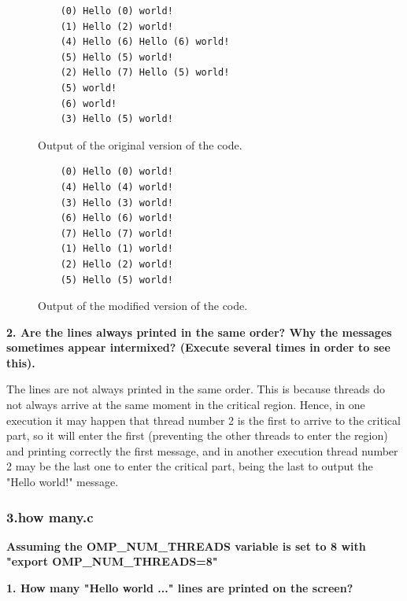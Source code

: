 \documentclass[12pt, a4paper]{article}
\begin{document}
\begin{figure}[H]
\begin{minipage}[b]{0.49\linewidth}

\begin{lstlisting}
	(0) Hello (0) world!
	(1) Hello (2) world!
	(4) Hello (6) Hello (6) world!
	(5) Hello (5) world!
	(2) Hello (7) Hello (5) world!
	(5) world!
	(6) world!
	(3) Hello (5) world!
\end{lstlisting}

\caption{Output of the original version of the code.}
\label{fig:bad_code}
\end{minipage}
\hspace{0.5cm}
\begin{minipage}[b]{0.46\linewidth}

\begin{lstlisting}
	(0) Hello (0) world!
	(4) Hello (4) world!
	(3) Hello (3) world!
	(6) Hello (6) world!
	(7) Hello (7) world!
	(1) Hello (1) world!
	(2) Hello (2) world!
	(5) Hello (5) world!
\end{lstlisting}

\caption{Output of the modified version of the code.}
\label{fig:good_code}
\end{minipage}
\end{figure}

\hfill

\textbf{2. Are the lines always printed in the same order? Why the messages sometimes appear intermixed? (Execute several times in order to see this).}

The lines are not always printed in the same order. This is because threads do not always arrive at the same moment in the critical region. Hence, in one execution it may happen that thread number 2 is the first to arrive to the critical part, so it will enter the first (preventing the other threads to enter the region) and printing correctly the first message, and in another execution thread number 2 may be the last one to enter the critical part, being the last to output the "Hello world!" message.

\subsubsection{3.how many.c}

\textbf{Assuming the OMP\_NUM\_THREADS variable is set to 8 with "export OMP\_NUM\_THREADS=8"}

\hfill

\textbf{1. How many "Hello world ..." lines are printed on the screen?}
\end{document}
